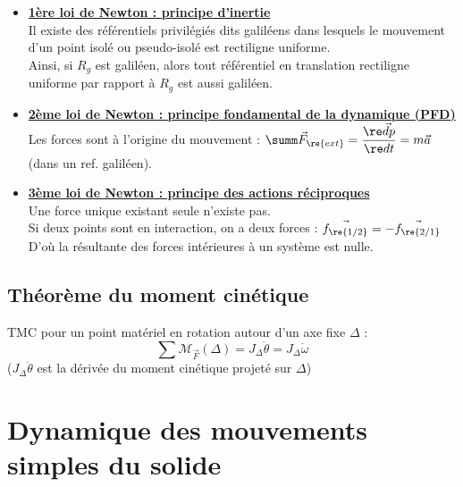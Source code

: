 \documentclass[13pt, twoside, a4paper, french]{report}
\begin{document}
                \begin{itemize}
                    \item \underline{\textbf{1ère loi de Newton : principe d’inertie}}\\
                    Il existe des référentiels privilégiés dits galiléens dans lesquels le mouvement d'un point isolé ou pseudo-isolé est rectiligne uniforme.\\
                    Ainsi, si $R_g$ est galiléen, alors tout référentiel en translation rectiligne uniforme par rapport à $R_g$ est aussi galiléen.\\

                    \item \underline{\textbf{2ème loi de Newton : principe fondamental de la dynamique (PFD)}}\\
                    Les forces sont à l’origine du mouvement : $\summ \vec F_\re{ext} = \dfrac{\re \vec d p}{\re d t} = m \vec a$ (dans un ref. galiléen).\\

                    \item \underline{\textbf{3ème loi de Newton : principe des actions réciproques}}\\
                    Une force unique existant seule n'existe pas.\\
                    Si deux points sont en interaction, on a deux forces : $\vec{f_\re{1/2}} = - \vec{f_\re{2/1}}$\\
                    D'où la résultante des forces intérieures à un système est nulle.
                \end{itemize}

            \subsection{Théorème du moment cinétique}\label{subsec:theoreme-du-moment-cinetique}

                TMC pour un point matériel en rotation autour d'un axe fixe $\Delta$ :
                \[\sum \mathcal{M}_{\vec F} (\Delta) = J_\Delta \ddot \theta = J_\Delta \dot \omega \]
                ($J_\Delta \ddot \theta$ est la dérivée du moment cinétique projeté sur $\Delta$)\\


        \section{Dynamique des mouvements simples du solide}\label{sec:dynamique-des-mouvements-simples-du-solide}
\end{document}
